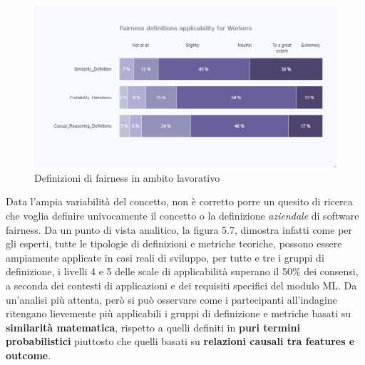     \begin{center}
			\hspace*{-5mm}%
	\end{center}
    
     \begin{figure}[h!]
        \centering
        \includegraphics[width=1\textwidth]{figure/Analisi/RQ1/Hist_Fairness_Deginitions_Applicability.png}
        \caption{Definizioni di fairness in ambito lavorativo}
    \end{figure}
    
    Data l'ampia variabilità del concetto, non è corretto porre un quesito di ricerca che voglia definire univocamente il concetto o la definizione \emph{aziendale} di software fairness. Da un punto di vista analitico, la figura 5.7, dimostra infatti come per gli esperti, tutte le tipologie di definizioni e metriche teoriche, possono essere ampiamente applicate in casi reali di sviluppo, per tutte e tre i gruppi di definizione, i livelli 4 e 5 delle scale di applicabilità superano il 50\% dei consensi, a seconda dei contesti di applicazioni e dei requisiti specifici del modulo ML. Da un'analisi più attenta, però si può osservare come i partecipanti all'indagine ritengano lievemente più applicabili i gruppi di definizione e metriche basati su \textbf{similarità matematica}, rispetto a quelli definiti in \textbf{puri termini probabilistici} piuttosto che quelli basati su \textbf{relazioni causali tra features e outcome}.
    
